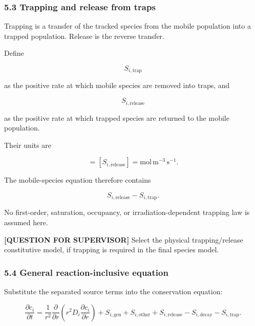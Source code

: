 \documentclass[11pt,a4paper]{article}
\begin{document}
\subsubsection*{5.3 Trapping and release from traps}

Trapping is a transfer of the tracked species from the mobile population into a trapped population. Release is the reverse transfer.

Define

\begin{equation}
S_{i,\mathrm{trap}}
\tag{TRISO-GOV-114}
\label{eq:triso-gov-114}
\end{equation}

as the positive rate at which mobile species are removed into traps, and

\begin{equation}
S_{i,\mathrm{release}}
\tag{TRISO-GOV-115}
\label{eq:triso-gov-115}
\end{equation}

as the positive rate at which trapped species are returned to the mobile population.

Their units are

\begin{equation}
[S_{i,\mathrm{trap}}]
=
[S_{i,\mathrm{release}}]
=
\mathrm{mol\,m^{-3}\,s^{-1}}.
\tag{TRISO-GOV-116}
\label{eq:triso-gov-116}
\end{equation}

The mobile-species equation therefore contains

\begin{equation}
S_{i,\mathrm{release}}-S_{i,\mathrm{trap}}.
\tag{TRISO-GOV-117}
\label{eq:triso-gov-117}
\end{equation}

No first-order, saturation, occupancy, or irradiation-dependent trapping law is assumed here.

\textbf{[QUESTION FOR SUPERVISOR]} Select the physical trapping/release constitutive model, if trapping is required in the final species model.

\subsubsection*{5.4 General reaction-inclusive equation}

Substitute the separated source terms into the conservation equation:

\begin{equation}
\frac{\partial c_i}{\partial t}
=
\frac{1}{r^2}
\frac{\partial}{\partial r}
\left(
r^2D_i\frac{\partial c_i}{\partial r}
\right)
+
S_{i,\mathrm{gen}}
+
S_{i,\mathrm{other}}
+
S_{i,\mathrm{release}}
-
S_{i,\mathrm{decay}}
-
S_{i,\mathrm{trap}}.
\tag{TRISO-GOV-118}
\label{eq:triso-gov-118}
\end{equation}
\end{document}

